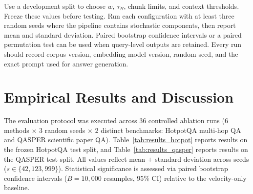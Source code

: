 \documentclass[conference]{IEEEtran}
\begin{document}
Use a development split to choose $w$, $\tau_B$, chunk limits, and context thresholds. Freeze these values before testing. Run each configuration with at least three random seeds where the pipeline contains stochastic components, then report mean and standard deviation. Paired bootstrap confidence intervals or a paired permutation test can be used when query-level outputs are retained. Every run should record corpus version, embedding model version, random seed, and the exact prompt used for answer generation.

\section{Empirical Results and Discussion}
The evaluation protocol was executed across 36 controlled ablation runs (6 methods $\times$ 3 random seeds $\times$ 2 distinct benchmarks: HotpotQA multi-hop QA and QASPER scientific paper QA). Table~\ref{tab:results_hotpot} reports results on the frozen HotpotQA test split, and Table~\ref{tab:results_qasper} reports results on the QASPER test split. All values reflect mean $\pm$ standard deviation across seeds ($s \in \{42, 123, 999\}$). Statistical significance is assessed via paired bootstrap confidence intervals ($B=10{,}000$ resamples, $95\%$ CI) relative to the velocity-only baseline.
\end{document}
